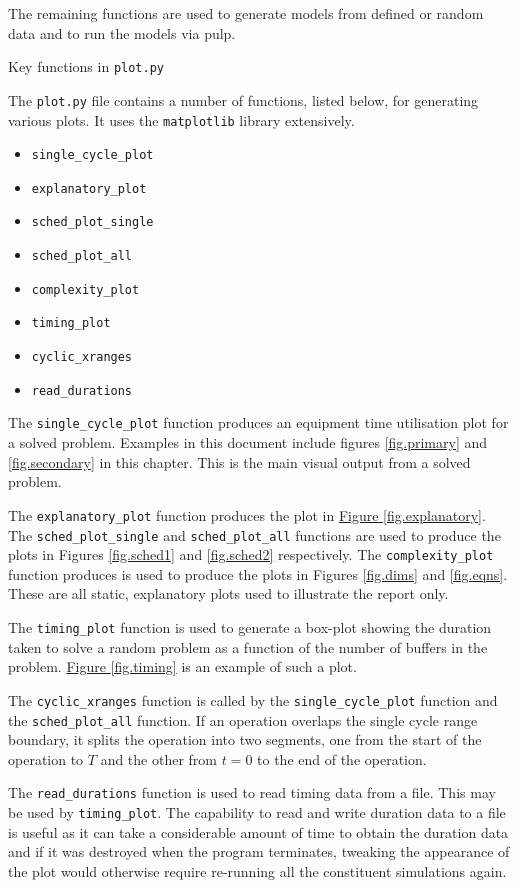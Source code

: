 The remaining functions are used to generate models from defined or random
data and to run the models via pulp.

\vspace{1cm}
{\Large Key functions in \texttt{plot.py}}

The \texttt{plot.py} file contains a number of functions, listed below, for
generating various plots.  It uses the \texttt{matplotlib} library extensively.
\begin{itemize}
    \item \texttt{single\_cycle\_plot}
    \item \texttt{explanatory\_plot}
    \item \texttt{sched\_plot\_single}
    \item \texttt{sched\_plot\_all}
    \item \texttt{complexity\_plot}
    \item \texttt{timing\_plot}
    \item \texttt{cyclic\_xranges}
    \item \texttt{read\_durations}
\end{itemize}

The \texttt{single\_cycle\_plot} function produces an equipment time
utilisation plot for a solved problem. Examples in this document include
figures \ref{fig.primary} and \ref{fig.secondary} in this chapter.  This is the
main visual output from a solved problem.

\sloppy
The \texttt{explanatory\_plot} function produces the plot in
\hyperref[fig.explanatory]{Figure \ref*{fig.explanatory}}.
The \texttt{sched\_plot\_single} and \texttt{sched\_plot\_all} functions are
used to produce the plots in Figures \ref{fig.sched1} and \ref{fig.sched2}
respectively.
The \texttt{complexity\_plot} function produces is used to produce the plots
in Figures \ref{fig.dims} and \ref{fig.eqns}.
These are all static, explanatory plots used to illustrate the
report only.

\fussy
The \texttt{timing\_plot} function is used to generate a box-plot showing the 
duration taken to solve a random problem as a function of the number of buffers
in the problem. \hyperref[fig.timing]{Figure \ref*{fig.timing}} is an example
of such a plot.

The \texttt{cyclic\_xranges} function is called by the
\texttt{single\_cycle\_plot} function and the \texttt{sched\_plot\_all}
function.
If an operation overlaps the single cycle range boundary, it splits the
operation into two segments, one from the start of the operation to $T$ and the
other from $t=0$ to the end of the operation.

The \texttt{read\_durations} function is used to read timing data from a file.
This may be used by \texttt{timing\_plot}.  The capability to read and write
duration data to a file is useful as it can take a considerable amount of time
to obtain the duration data and if it was destroyed when the program
terminates, tweaking the appearance of the plot would otherwise require
re-running all the constituent simulations again.
